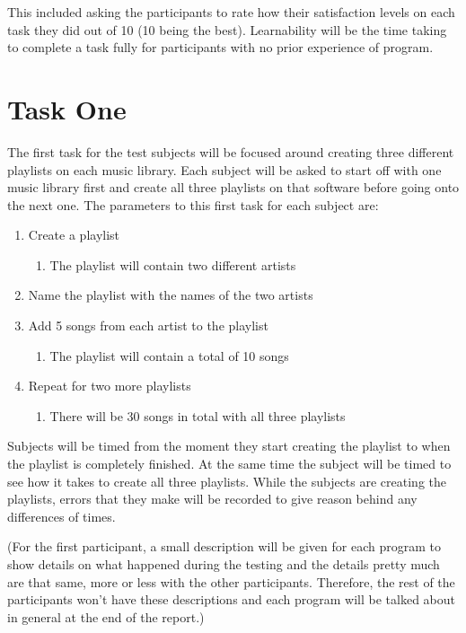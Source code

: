 \documentclass{article}
\begin{document}
This included asking the participants to rate how their satisfaction levels on each task they did out of 10 (10 being the best). Learnability will be the time taking to complete a task fully for participants with no prior experience of program.

\section{Task One}
The first task for the test subjects will be focused around creating three different playlists on each music library. Each subject will be asked to start off with one music library first and create all three playlists on that software before going onto the next one. The parameters to this first task for each subject are:


\begin{enumerate}
  \item Create a playlist
  \begin{enumerate}
    \item The playlist will contain two different artists
  \end{enumerate}
  \item Name the playlist with the names of the two artists
  \item Add 5 songs from each artist to the playlist
  \begin{enumerate}
    \item The playlist will contain a total of 10 songs 
  \end{enumerate}
  \item Repeat for two more playlists
  \begin{enumerate}
    \item There will be 30 songs in total with all three playlists
  \end{enumerate} 
\end{enumerate}

Subjects will be timed from the moment they start creating the playlist to when the playlist is completely finished. At the same time the subject will be timed to see how it takes to create all three playlists. While the subjects are creating the playlists, errors that they make will be recorded to give reason behind any differences of times.

(For the first participant, a small description will be given for each program to show details on what happened during the testing and the details pretty much are that same, more or less with the other participants. Therefore, the rest of the participants won't have these descriptions and each program will be talked about in general at the end of the report.) 
\end{document}

